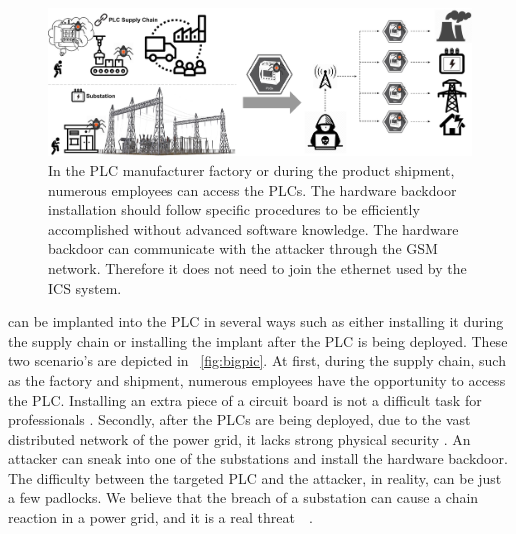 \begin{figure}[ht]
	\includegraphics[width=\textwidth]{figures/bigpic}
	\centering
	\caption{In the PLC manufacturer factory or during the product shipment, numerous employees can access the PLCs. The hardware backdoor installation should follow specific procedures to be efficiently accomplished without advanced software knowledge. The hardware backdoor can communicate with the attacker through the GSM network. Therefore it does not need to join the ethernet used by the ICS system.}
	\label{fig:bigpic}
\end{figure}

\name can be implanted into the PLC in several ways such as either installing it during the supply chain or installing the implant after the PLC is being deployed. These two scenario's are depicted in ~\autoref{fig:bigpic}. At first, during the supply chain, such as the factory and shipment, numerous employees have the opportunity to access the PLC. Installing an extra piece of a circuit board is not a difficult task for professionals \cite{harrison2021malicious, o2015special}. Secondly, after the PLCs are being deployed, due to the vast distributed network of the power grid, it lacks strong physical security \cite{Loopholes2020}. An attacker can sneak into one of the substations and install the hardware backdoor. The difficulty between the targeted PLC and the attacker, in reality, can be just a few padlocks. We believe that the breach of a substation can cause a chain reaction in a power grid, and it is a real threat~\cite{substationattack}~\cite{chen2020study}.




